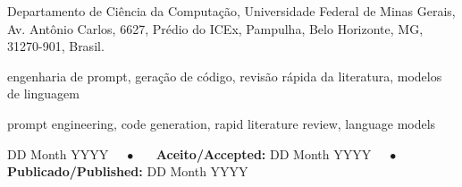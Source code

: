 \documentclass[brazilian]{sbcreviews-2025}
\title[Engenharia de Prompt para Codificação e Implementação de Software]{\titulotcc}
\begin{document}
\begin{frontmatter}

\maketitle

\begin{mail}
Departamento de Ciência da Computação, Universidade Federal de Minas Gerais, Av. Antônio Carlos, 6627, Prédio do ICEx, Pampulha, Belo Horizonte, MG, 31270-901, Brasil.
\end{mail}

\begin{abstract-pt}

\end{abstract-pt}

\begin{abstract-en}

\end{abstract-en}

\begin{pchaves}
engenharia de prompt, geração de código, revisão rápida da literatura, modelos de linguagem
\end{pchaves}

\begin{keywords}
prompt engineering, code generation, rapid literature review, language models
\end{keywords}

\begin{dates}
 DD Month YYYY~~~$\bullet$~~~
{\sffamily\textbf{Aceito/Accepted:}} DD Month YYYY~~~$\bullet$~~~
{\sffamily\textbf{Publicado/Published:}} DD Month YYYY
\end{dates}

\end{frontmatter}















\end{document}
